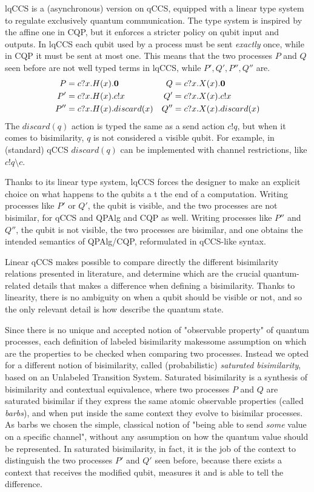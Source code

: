 lqCCS is a (asynchronous) version on qCCS, equipped with a linear type system to regulate exclusively quantum communication. The type system is inspired by the affine one in CQP, but it enforces a stricter policy on qubit input and outputs. In lqCCS each qubit used by a process must be sent \textit{exactly} once, while in CQP it must be sent at most one. This means that the two processes $P$ and $Q$ seen before are not well typed terms in lqCCS, while $P', Q', P'', Q''$ are.
\begin{align*}
P &= c?x.H(x).\mathbf{0} &  Q &= c?x.X(x).\mathbf{0} \\
P' &= c?x.H(x).c!x &  Q' &= c?x.X(x).c!x \\
P'' &= c?x.H(x).discard(x) &  Q'' &= c?x.X(x).discard(x)
\end{align*}
The $discard(q)$ action is typed the same as a send action $c!q$, but when it comes to bisimilarity, $q$ is not considered a visible qubit. For example, in (standard) qCCS $discard(q)$ can be implemented with channel restrictions, like $c!q\setminus c$.

Thanks to its linear type system, lqCCS forces the designer to make an explicit choice on what happens to the qubits a t the end of a computation. Writing processes like $P'$ or $Q'$, the qubit is visible, and the two processes are not bisimilar, for qCCS and QPAlg and CQP as well. Writing processes like $P''$ and $Q''$, the qubit is not visible, the two processes are bisimilar, and one obtains the intended semantics of QPAlg/CQP, reformulated in qCCS-like syntax.

Linear qCCS makes possible to compare directly the different bisimilarity relations presented in literature, and determine which are the crucial  quantum-related details that makes a difference when defining a bisimilarity. Thanks to linearity, there is no ambiguity on when a qubit should be visible or not, and so the only relevant detail is how describe the quantum state. 

Since there  is no unique and accepted notion of "observable property" of quantum processes, each definition of labeled bisimilarity makessome assumption on which are the properties to be checked when comparing two processes. Instead we opted for a different notion of bisimilarity, called (probabilistic) \textit{saturated bisimilarity}, based on an Unlabeled Transition System. Saturated bisimilarity is a synthesis of bisimilarity and contextual equivalence, where two processes $P$ and $Q$ are saturated bisimilar if they express the same atomic observable properties (called \textit{barbs}), and when put inside the same context they evolve to bisimilar processes. As barbs we chosen the simple, classical notion of "being able to send \textit{some} value on a specific channel", without any assumption on how the quantum value should be represented. In saturated bisimilarity, in fact, it is the job of the context to distinguish the two processes $P'$ and $Q'$ seen before, because there exists a context that receives the modified qubit, measures it and is able to tell the difference.

